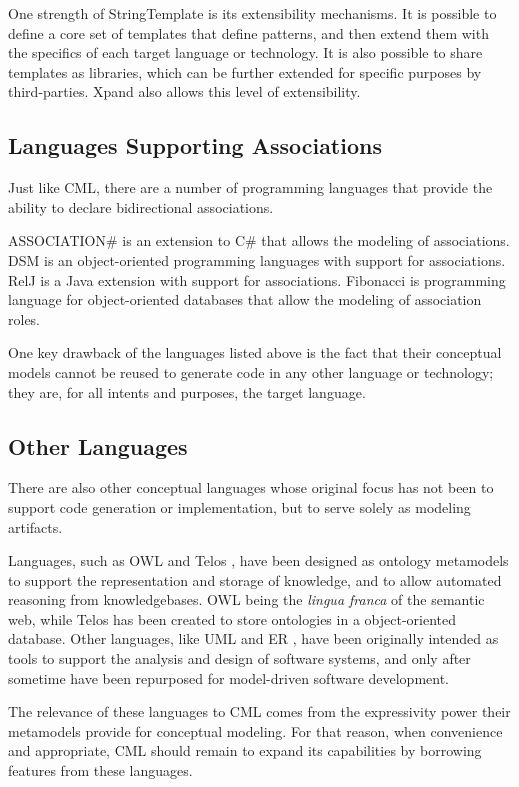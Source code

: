 One strength of StringTemplate is its extensibility mechanisms.
It is possible to define a core set of templates that define patterns, 
and then extend them with the specifics of each target language or technology.
It is also possible to share templates as libraries,
which can be further extended for specific purposes by third-parties.
Xpand also allows this level of extensibility.

\subsection{Languages Supporting Associations}

Just like CML,
there are a number of programming languages that provide the ability to declare bidirectional associations.

ASSOCIATION\# \cite{cardoso} is an extension to C\# that allows the modeling of associations.
DSM \cite{balzer} is an object-oriented programming languages with support for associations.
RelJ \cite{bierman} is a Java extension with support for associations.
Fibonacci \cite{fibonacci}  is programming language for object-oriented databases
that allow the modeling of association roles.

One key drawback of the languages listed above is the fact that their conceptual models
cannot be reused to generate code in any other language or technology;
they are, for all intents and purposes, the target language.

\subsection{Other Languages}

There are also other conceptual languages whose original focus has not been to support code generation or implementation,
but to serve solely as modeling artifacts.

Languages, such as OWL \cite{owl2} and Telos \cite{telos}, have been designed as ontology metamodels
to support the representation and storage of knowledge,
and to allow automated reasoning from knowledgebases.
OWL being the \emph{lingua franca} of the semantic web,
while Telos has been created to store ontologies in a object-oriented database.
Other languages, like UML \cite{uml} and ER \cite{er}, have been originally intended as tools to support the analysis and design of software systems, and only after sometime have been repurposed for model-driven software development.

The relevance of these languages to CML comes from the expressivity power their metamodels provide for conceptual modeling. For that reason, when convenience and appropriate, CML should remain to expand its capabilities by borrowing features from these languages.
